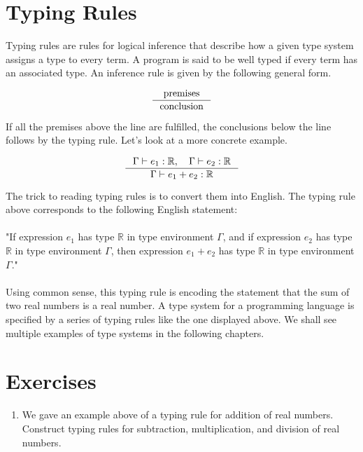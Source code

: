 \documentclass[book.tex]{subfiles}
\begin{document}
\section{Typing Rules}

Typing rules are rules for logical inference that describe how a given type system assigns a type to every term. A program is said to be well typed if every term has an associated type. An inference rule is given by the following general form.

\begin{align}
    \inference[]
    {
     \textrm{premises}
    }
    {
     \textrm{conclusion}
    }
\end{align}

If all the premises above the line are fulfilled, the conclusions below the line follows by the typing rule. Let's look at a more concrete example.

\begin{align}
    \inference[]
    {
    \Gamma \vdash e_1 : \mathbb{R}, \quad \Gamma \vdash e_2 : \mathbb{R}
    }
    {
    \Gamma \vdash e_1 + e_2 : \mathbb{R}
    }
\end{align}

The trick to reading typing rules is to convert them into English. The typing rule above corresponds to the following English statement: 
\\ \\
"If expression $e_1$ has type $\mathbb{R}$ in type environment $\Gamma$, and if expression $e_2$ has type $\mathbb{R}$ in type environment $\Gamma$, then expression $e_1 + e_2$ has type $\mathbb{R}$ in type environment $\Gamma$." 
\\ \\
Using common sense, this typing rule is encoding the statement that the sum of two real numbers is a real number. A type system for a programming language is specified by a series of typing rules like the one displayed above. We shall see multiple examples of type systems in the following chapters.

\section{Exercises}

\begin{enumerate}
    \item We gave an example above of a typing rule for addition of real numbers. Construct typing rules for subtraction, multiplication, and division of real numbers.
\end{enumerate}
\end{document}
